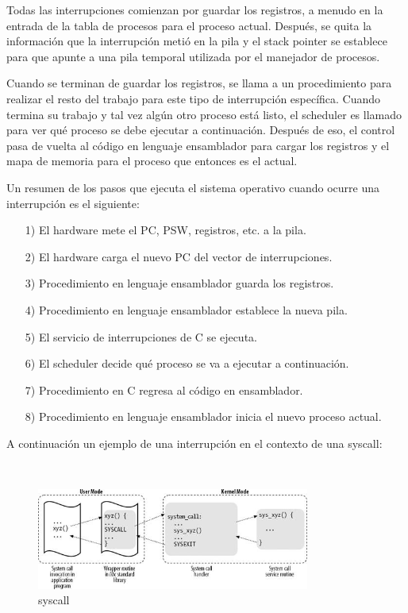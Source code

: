 Todas las interrupciones comienzan por guardar los registros, a menudo en la entrada de la tabla de procesos para el proceso actual. Después, se quita la información que la interrupción metió en la pila y el stack pointer se establece para que apunte a una pila temporal utilizada por el manejador de procesos.

Cuando se terminan de guardar los registros, se llama a un procedimiento para realizar el resto del trabajo para este tipo de interrupción específica. Cuando termina su trabajo y tal vez algún otro proceso está listo, el scheduler es llamado para ver qué proceso se debe ejecutar a continuación. Después de eso, el control pasa de vuelta al código en lenguaje ensamblador para cargar los registros y el mapa de memoria para el proceso que entonces es el actual.

Un resumen de los pasos que ejecuta el sistema operativo cuando ocurre una interrupción es el siguiente:

\begin{enumerate}[1]
\item[1)] El hardware mete el PC, PSW, registros, etc. a la pila.
\item[2)] El hardware carga el nuevo PC del vector de interrupciones.
\item[3)] Procedimiento en lenguaje ensamblador guarda los registros.
\item[4)] Procedimiento en lenguaje ensamblador establece la nueva pila.
\item[5)] El servicio de interrupciones de C se ejecuta.
\item[6)] El scheduler decide qué proceso se va a ejecutar a continuación.
\item[7)] Procedimiento en C regresa al código en ensamblador.
\item[8)] Procedimiento en lenguaje ensamblador inicia el nuevo proceso actual.
\end{enumerate}

A continuación un ejemplo de una interrupción en el contexto de una syscall:

~\\
\begin{figure}[h]
	\begin{center}
	\includegraphics[width=0.8\textwidth]{imagenes/syscall.png}
	\caption{syscall}
	\end{center}
\end{figure}
~\\


